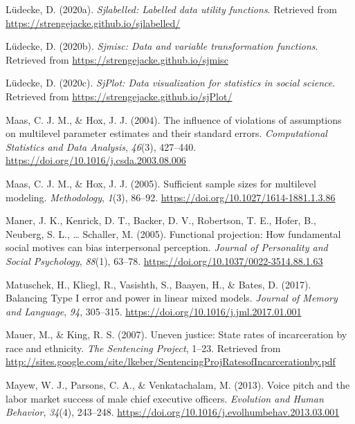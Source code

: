 \documentclass[
  english,
  man, noextraspace,floatsintext]{apa6}
\newlength{\cslhangindent}
\newenvironment{cslreferences}%
  {\setlength{\parindent}{0pt}%
  \everypar{\setlength{\hangindent}{\cslhangindent}}\ignorespaces}%
  {\par}
\begin{document}
\begin{cslreferences}
\leavevmode\hypertarget{ref-R-sjlabelled}{}%
Lüdecke, D. (2020a). \emph{Sjlabelled: Labelled data utility functions}. Retrieved from \url{https://strengejacke.github.io/sjlabelled/}

\leavevmode\hypertarget{ref-R-sjmisc}{}%
Lüdecke, D. (2020b). \emph{Sjmisc: Data and variable transformation functions}. Retrieved from \url{https://strengejacke.github.io/sjmisc}

\leavevmode\hypertarget{ref-R-sjPlot}{}%
Lüdecke, D. (2020c). \emph{SjPlot: Data visualization for statistics in social science}. Retrieved from \url{https://strengejacke.github.io/sjPlot/}

\leavevmode\hypertarget{ref-Maas2004}{}%
Maas, C. J. M., \& Hox, J. J. (2004). The influence of violations of assumptions on multilevel parameter estimates and their standard errors. \emph{Computational Statistics and Data Analysis}, \emph{46}(3), 427--440. \url{https://doi.org/10.1016/j.csda.2003.08.006}

\leavevmode\hypertarget{ref-Maas2005}{}%
Maas, C. J. M., \& Hox, J. J. (2005). Sufficient sample sizes for multilevel modeling. \emph{Methodology}, \emph{1}(3), 86--92. \url{https://doi.org/10.1027/1614-1881.1.3.86}

\leavevmode\hypertarget{ref-Maner2005}{}%
Maner, J. K., Kenrick, D. T., Backer, D. V., Robertson, T. E., Hofer, B., Neuberg, S. L., \ldots{} Schaller, M. (2005). Functional projection: How fundamental social motives can bias interpersonal perception. \emph{Journal of Personality and Social Psychology}, \emph{88}(1), 63--78. \url{https://doi.org/10.1037/0022-3514.88.1.63}

\leavevmode\hypertarget{ref-Matuschek2017}{}%
Matuschek, H., Kliegl, R., Vasishth, S., Baayen, H., \& Bates, D. (2017). Balancing Type I error and power in linear mixed models. \emph{Journal of Memory and Language}, \emph{94}, 305--315. \url{https://doi.org/10.1016/j.jml.2017.01.001}

\leavevmode\hypertarget{ref-Mauer2007}{}%
Mauer, M., \& King, R. S. (2007). Uneven justice: State rates of incarceration by race and ethnicity. \emph{The Sentencing Project}, 1--23. Retrieved from \url{http://sites.google.com/site/lkeber/SentencingProjRatesofIncarcerationby.pdf}

\leavevmode\hypertarget{ref-Mayew2013}{}%
Mayew, W. J., Parsons, C. A., \& Venkatachalam, M. (2013). Voice pitch and the labor market success of male chief executive officers. \emph{Evolution and Human Behavior}, \emph{34}(4), 243--248. \url{https://doi.org/10.1016/j.evolhumbehav.2013.03.001}


\end{cslreferences}
\end{document}
